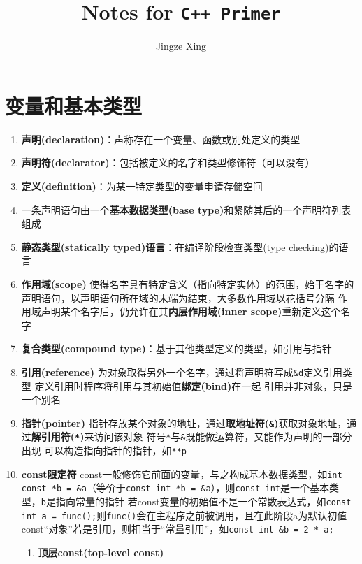 \documentclass[10pt]{article}
\title{Notes for \texttt{C++ Primer}}
\author{Jingze Xing}
\begin{document}
\maketitle
\tableofcontents
\newpage
\section{变量和基本类型}
\begin{enumerate}
  \item \textbf{声明(declaration)}：声称存在一个变量、函数或别处定义的类型
  \item \textbf{声明符(declarator)}：包括被定义的名字和类型修饰符（可以没有）
  \item \textbf{定义(definition)}：为某一特定类型的变量申请存储空间
  \item 一条声明语句由一个\textbf{基本数据类型(base type)}和紧随其后的一个声明符列表组成
  \item \textbf{静态类型(statically typed)语言}：在编译阶段检查类型(type checking)的语言
  \item \textbf{作用域(scope)}
  \subitem 使得名字具有特定含义（指向特定实体）的范围，始于名字的声明语句，以声明语句所在域的末端为结束，大多数作用域以花括号分隔
  \subitem 作用域声明某个名字后，仍允许在其\textbf{内层作用域(inner scope)}重新定义这个名字
  \item \textbf{复合类型(compound type)}：基于其他类型定义的类型，如引用与指针
  \item \textbf{引用(reference)}
  \subitem 为对象取得另外一个名字，通过将声明符写成\texttt{\&d}定义引用类型
  \subitem 定义引用时程序将引用与其初始值\textbf{绑定(bind)}在一起
  \subitem 引用并非对象，只是一个别名
  \item \textbf{指针(pointer)}
  \subitem 指针存放某个对象的地址，通过\textbf{取地址符(\texttt{\&})}获取对象地址，通过\textbf{解引用符(\texttt{*})}来访问该对象
  \subitem 符号\texttt{*}与\texttt{\&}既能做运算符，又能作为声明的一部分出现
  \subitem 可以构造指向指针的指针，如\texttt{**p}
  \item \textbf{const限定符}
  \subitem const一般修饰它前面的变量，与之构成基本数据类型，如\texttt{int const *b = \&a}（等价于\texttt{const int *b = \&a}），则\texttt{const int}是一个基本类型，\texttt{b}是指向常量的指针
  \subitem 若const变量的初始值不是一个常数表达式，如\texttt{const int a = func();}则\texttt{func()}会在主程序之前被调用，且在此阶段a为默认初值
  \subitem const“对象”若是引用，则相当于“常量引用”，如\texttt{const int \&b = 2 * a;}
  \begin{enumerate}
    \item \textbf{顶层const(top-level const)}

\end{enumerate}
\end{enumerate}
\end{document}
